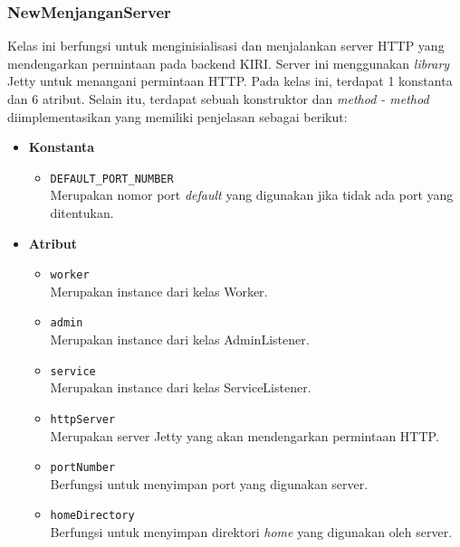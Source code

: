 \subsubsection{NewMenjanganServer}
Kelas ini berfungsi untuk menginisialisasi dan menjalankan server HTTP yang mendengarkan permintaan pada backend KIRI. Server ini menggunakan \textit{library} Jetty untuk menangani permintaan HTTP. Pada kelas ini, terdapat 1 konstanta dan 6 atribut. Selain itu, terdapat sebuah konstruktor dan \textit{method - method} diimplementasikan yang memiliki penjelasan sebagai berikut:
\begin{itemize}
    \item \textbf{Konstanta}
    \begin{itemize}
        \item \texttt{DEFAULT\_PORT\_NUMBER}
        \\ Merupakan nomor port \textit{default} yang digunakan jika tidak ada port yang ditentukan.
    \end{itemize}

    \item \textbf{Atribut}
    \begin{itemize}
        \item \texttt{worker}
        \\ Merupakan instance dari kelas Worker.
        \item \texttt{admin}
        \\ Merupakan instance dari kelas AdminListener.
        \item \texttt{service}
        \\ Merupakan instance dari kelas ServiceListener.
        \item \texttt{httpServer}
        \\ Merupakan server Jetty yang akan mendengarkan permintaan HTTP.
        \item \texttt{portNumber}
        \\ Berfungsi untuk menyimpan port yang digunakan server.
        \item \texttt{homeDirectory}
        \\ Berfungsi untuk menyimpan direktori \textit{home} yang digunakan oleh server. 
    \end{itemize}
    

\end{itemize}
